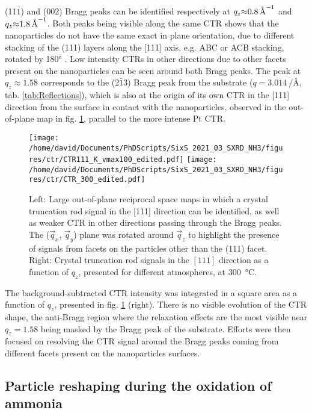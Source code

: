 (11$\bar{1}$) and (002) Bragg peaks can be identified respectively at $q_z \qty{\approx0.8}{\per\angstrom}$ and $q_z \qty{\approx1.8}{\per\angstrom}$.
Both peaks being visible along the same CTR shows that the nanoparticles do not have the same exact in plane orientation, due to different stacking of the (111) layers along the [111] axis, e.g. ABC or ACB stacking, rotated by \ang{180} \parencite{Jones2019}.
Low intensity CTRs in other directions due to other facets present on the nanoparticles can be seen around both Bragg peaks.
The peak at $q_z\approx1.58$ corresponds to the (2$\bar{1}$3) Bragg peak from the  substrate ($q = \qty{3.014}{\per\angstrom}$, tab. \ref{tab:Reflections}), which is also at the origin of its own CTR in the [111] direction from the surface in contact with the nanoparticles, observed in the out-of-plane map in fig. \ref{fig:2DCTR111Particles}, parallel to the more intense Pt CTR.

\begin{figure}[!htb]
    \centering
    \texttt{[image: /home/david/Documents/PhDScripts/SixS\_2021\_03\_SXRD\_NH3/figures/ctr/CTR111\_K\_vmax100\_edited.pdf]}
    \texttt{[image: /home/david/Documents/PhDScripts/SixS\_2021\_03\_SXRD\_NH3/figures/ctr/CTR\_300\_edited.pdf]}
    \caption{
        Left: Large out-of-plane reciprocal space maps in which a crystal truncation rod signal in the [111] direction can be identified, as well as weaker CTR in other directions passing through the Bragg peaks.
        The ($\vec{q}_x$, $\vec{q}_y$) plane was rotated around $\vec{q}_z$ to highlight the presence of signals from facets on the particles other than the (111) facet.
        Right: Crystal truncation rod signals in the $[111]$ direction as a function of $q_z$, presented for different atmospheres, at \qty{300}{\degreeCelsius}.
    }
    \label{fig:2DCTR111Particles}
\end{figure}

The background-subtracted CTR intensity was integrated in a square area as a function of $q_z$, presented in fig. \ref{fig:2DCTR111Particles} (right).
There is no visible evolution of the CTR shape, the anti-Bragg region where the relaxation effects are the most visible near $q_z=1.58$ being masked by the Bragg peak of the substrate.
Efforts were then focused on resolving the CTR signal around the Bragg peaks coming from different facets present on the nanoparticles surfaces.

\subsection{Particle reshaping during the oxidation of ammonia}

